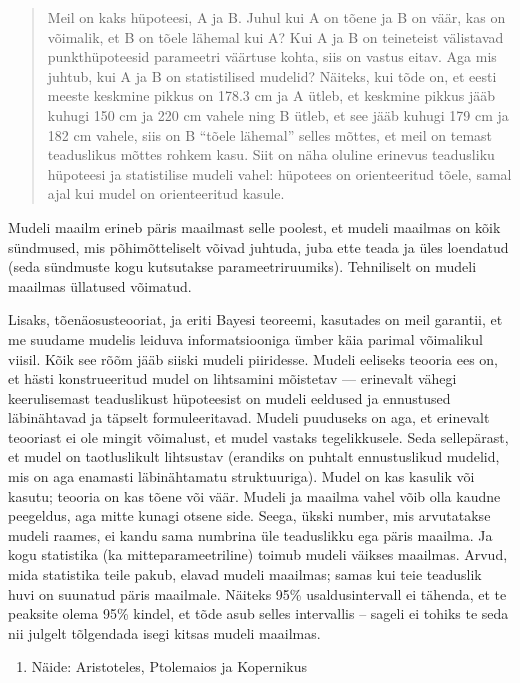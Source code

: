 \documentclass[]{book}
\providecommand{\tightlist}{%
  \setlength{\itemsep}{0pt}\setlength{\parskip}{0pt}}
\begin{document}
\begin{quote}
Meil on kaks hüpoteesi, A ja B. Juhul kui A on tõene ja B on väär, kas on võimalik, et B on tõele lähemal kui A? Kui A ja B on teineteist välistavad punkthüpoteesid parameetri väärtuse kohta, siis on vastus eitav. Aga mis juhtub, kui A ja B on statistilised mudelid? Näiteks, kui tõde on, et eesti meeste keskmine pikkus on 178.3 cm ja A ütleb, et keskmine pikkus jääb kuhugi 150 cm ja 220 cm vahele ning B ütleb, et see jääb kuhugi 179 cm ja 182 cm vahele, siis on B ``tõele lähemal'' selles mõttes, et meil on temast teaduslikus mõttes rohkem kasu. Siit on näha oluline erinevus teadusliku hüpoteesi ja statistilise mudeli vahel: hüpotees on orienteeritud tõele, samal ajal kui mudel on orienteeritud kasule.
\end{quote}

Mudeli maailm erineb päris maailmast selle poolest, et mudeli maailmas on kõik sündmused, mis põhimõtteliselt võivad juhtuda, juba ette teada ja üles loendatud (seda sündmuste kogu kutsutakse parameetriruumiks). Tehniliselt on mudeli maailmas üllatused võimatud.

Lisaks, tõenäosusteooriat, ja eriti Bayesi teoreemi, kasutades on meil garantii, et me suudame mudelis leiduva informatsiooniga ümber käia parimal võimalikul viisil. Kõik see rõõm jääb siiski mudeli piiridesse.
Mudeli eeliseks teooria ees on, et hästi konstrueeritud mudel on lihtsamini mõistetav --- erinevalt vähegi keerulisemast teaduslikust hüpoteesist on mudeli eeldused ja ennustused läbinähtavad ja täpselt formuleeritavad. Mudeli puuduseks on aga, et erinevalt teooriast ei ole mingit võimalust, et mudel vastaks tegelikkusele. Seda sellepärast, et mudel on taotluslikult lihtsustav (erandiks on puhtalt ennustuslikud mudelid, mis on aga enamasti läbinähtamatu struktuuriga). Mudel on kas kasulik või kasutu; teooria on kas tõene või väär. Mudeli ja maailma vahel võib olla kaudne peegeldus, aga mitte kunagi otsene side. Seega, ükski number, mis arvutatakse mudeli raames, ei kandu sama numbrina üle teaduslikku ega päris maailma. Ja kogu statistika (ka mitteparameetriline) toimub mudeli väikses maailmas. Arvud, mida statistika teile pakub, elavad mudeli maailmas; samas kui teie teaduslik huvi on suunatud päris maailmale. Näiteks 95\% usaldusintervall ei tähenda, et te peaksite olema 95\% kindel, et tõde asub selles intervallis -- sageli ei tohiks te seda nii julgelt tõlgendada isegi kitsas mudeli maailmas.

\begin{enumerate}
\def\labelenumi{(\arabic{enumi})}
\setcounter{enumi}{2}
\tightlist
\item
  Näide: Aristoteles, Ptolemaios ja Kopernikus
\end{enumerate}
\end{document}
